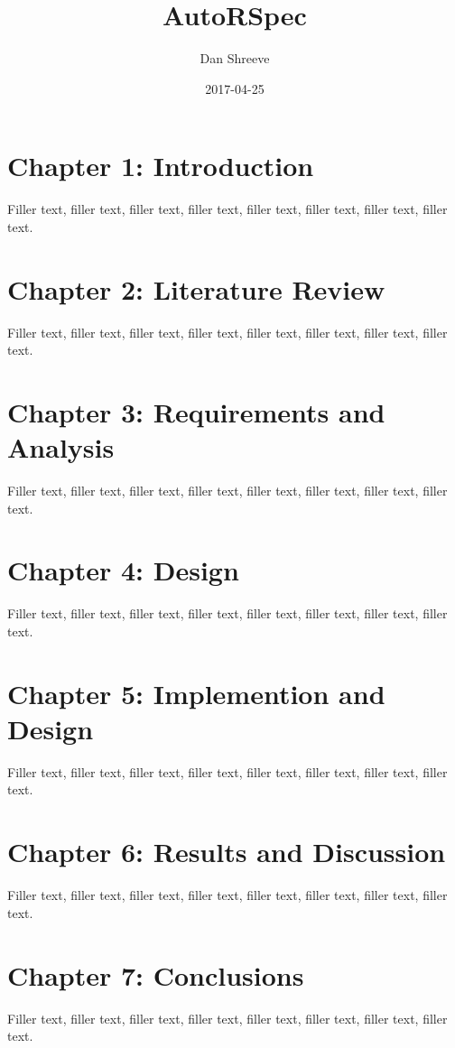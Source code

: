 \documentclass{article}
\title{AutoRSpec}
\date{2017-04-25}
\author{Dan Shreeve}
\begin{document}
	\maketitle
	\newpage
	\tableofcontents
	\newpage
	
	\section{Chapter 1: Introduction}
		Filler text, filler text, filler text, filler text, filler text, filler text, filler text, filler text.
	\section{Chapter 2: Literature Review}
		Filler text, filler text, filler text, filler text, filler text, filler text, filler text, filler text.
	\section{Chapter 3: Requirements and Analysis}
		Filler text, filler text, filler text, filler text, filler text, filler text, filler text, filler text.
	\section{Chapter 4: Design}
		Filler text, filler text, filler text, filler text, filler text, filler text, filler text, filler text.
	\section{Chapter 5: Implemention and Design}
		Filler text, filler text, filler text, filler text, filler text, filler text, filler text, filler text.
	\section{Chapter 6: Results and Discussion}
		Filler text, filler text, filler text, filler text, filler text, filler text, filler text, filler text.
	\section{Chapter 7: Conclusions}
		Filler text, filler text, filler text, filler text, filler text, filler text, filler text, filler text.

	
	
\end{document}
